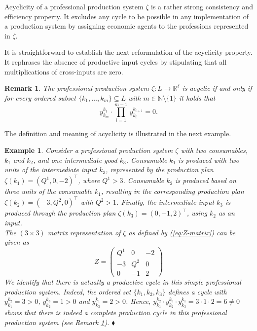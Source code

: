 \documentclass[11pt,fleqn]{article}
\newtheorem{expl}[theorem]{Example}
\newtheorem{remark}[theorem]{Remark}
\newenvironment{example}{\begin{expl} \rm}{\hfill $\blacklozenge$
\end{expl}}
\begin{document}
\noindent
Acyclicity of a professional production system $\zeta$ is a rather strong consistency and efficiency property. It excludes any cycle to be possible in any implementation of a production system by assigning economic agents to the professions represented in $\zeta$. 

It is straightforward to establish the next reformulation of the acyclicity property. It rephrases the absence of productive input cycles by stipulating that all multiplications of cross-inputs are zero.

\begin{remark} \label{rem:Acyclicity}
	The professional production system $\zeta \colon L \to \mathbb R^\ell$ is acyclic if and only if for every ordered subset $\{ k_1, \ldots , k_m \} \subseteq L$ with $m \in \mathbb N \setminus \{ 1 \}$ it holds that
	\begin{equation*}
	y^{k_1}_{k_m} \cdot \prod_{i =1}^{m-1} \, y_{k_i}^{k_{i+1}} =0.
	\end{equation*}
\end{remark}

\noindent
The definition and meaning of acyclicity is illustrated in the next example. 

\begin{example} \label{ex:Acyclicity}
	Consider a professional production system $\zeta$ with two consumables, $k_1$ and $k_2$, and one intermediate good $k_3$. Consumable $k_1$ is produced with two units of the intermediate input $k_3$, represented by the production plan $\zeta(k_1)= (Q^1, 0 ,-2)^\top $, where $Q^1>3$. Consumable $k_2$ is produced based on three units of the consumable $k_1$, resulting in the corresponding production plan $\zeta (k_2) = (-3,Q^2,0)^\top $ with $Q^2>1$. Finally, the intermediate input $k_3$ is produced through the production plan $\zeta (k_3)= (0,-1,2)^\top $, using $k_2$ as an input. \\
	The $(3 \times 3)$ matrix representation of $\zeta$ as defined by (\ref{eq:Z-matrix}) can be given as
	\[
	Z =
	\begin{pmatrix}
	Q^1 & 0 & - 2 \\
	-3 & Q^2 & 0 \\
	0 & -1 & 2
	\end{pmatrix}
	\]
	We identify that there is actually a productive cycle in this simple professional production system. Indeed, the ordered set $\{ k_1, k_2,k_3 \}$ defines a cycle with $y^{k_2}_{k_1} =3 >0$, $y^{k_3}_{k_2} =1 >0$ and $y^{k_1}_{k_3} =2 >0$. Hence, $  y^{k_2}_{k_1}\cdot y^{k_3}_{k_2}\cdot y^{k_1}_{k_3}  = 3 \cdot 1 \cdot 2 =6 \neq 0$ shows that there is indeed a complete production cycle in this professional production system (see Remark \ref{rem:Acyclicity}).  
\end{example}
\end{document}
